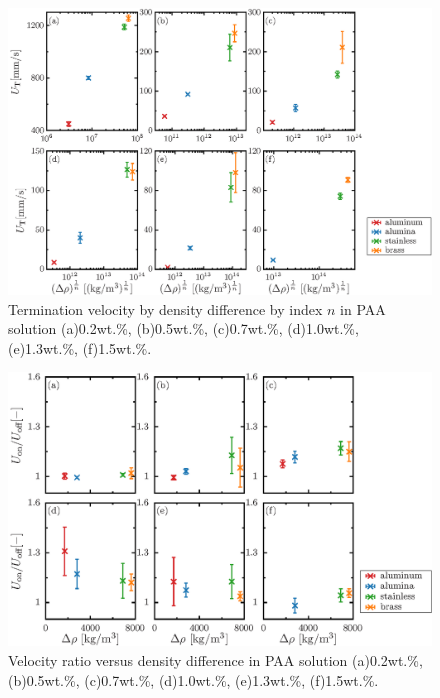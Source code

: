 \begin{figure}[ht]
    \centering
    \includegraphics[width=1.0\textwidth]{./5-Results/rhoUT_index_n.eps}
    \caption{Termination velocity by density difference by index $n$ in PAA solution (a)0.2wt.\%, (b)0.5wt.\%, (c)0.7wt.\%, (d)1.0wt.\%, (e)1.3wt.\%, (f)1.5wt.\%.}
    \label{fig:rhoUT_n}
\end{figure}

\begin{figure}[ht]
    \centering
    \includegraphics[width=1.0\textwidth]{./5-Results/rhoUdiff.eps}
    \caption{Velocity ratio versus density difference in PAA solution (a)0.2wt.\%, (b)0.5wt.\%, (c)0.7wt.\%, (d)1.0wt.\%, (e)1.3wt.\%, (f)1.5wt.\%.}
    \label{fig:rhoUdiff}
\end{figure}

